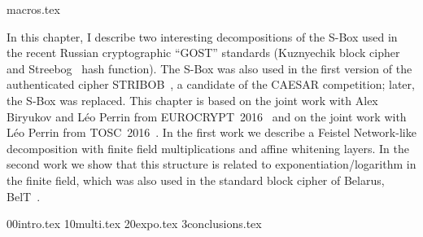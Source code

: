 \myminitoc

{macros.tex}

In this chapter, I describe two interesting decompositions of the S-Box used in the recent Russian cryptographic ``GOST'' standards (Kuznyechik block cipher and Streebog~\cite{streebog} hash function). The S-Box was also used in the first version of the authenticated cipher STRIBOB~\cite{STRIBOB}, a candidate of the CAESAR competition; later, the S-Box was replaced.
This chapter is based on the joint work with Alex Biryukov and Léo Perrin from EUROCRYPT~2016~\cite{OurKuz1} and on the joint work with Léo Perrin from TOSC~2016~\cite{OurKuz2}. In the first work we describe a Feistel Network-like decomposition with finite field multiplications and affine whitening layers. In the second work we show that this structure is related to exponentiation/logarithm in the finite field, which was also used in the standard block cipher of Belarus, BelT~\cite{BELT}.

{00intro.tex}
{10multi.tex}
{20expo.tex}
{3conclusions.tex}
